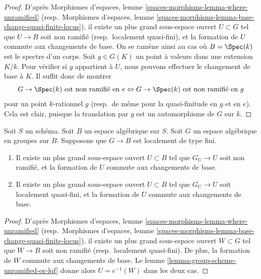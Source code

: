 \begin{proof}
D'après Morphismes d'espaces, lemme \ref{spaces-morphisms-lemma-where-unramified} (resp.\ Morphismes d'espaces, lemme \ref{spaces-morphisms-lemma-base-change-quasi-finite-locus}), il existe un plus grand sous-espace ouvert $U \subset G$ tel que $U \to B$ soit non ramifié (resp.\ localement quasi-fini), et la formation de $U$ commute aux changements de base. On se ramène ainsi au cas où $B = \Spec(k)$ est le spectre d'un corps. Soit $g \in G(K)$ un point à valeurs dans une extension $K/k$. Pour vérifier si $g$ appartient à $U$, nous pouvons effectuer le changement de base à $K$. Il suffit donc de montrer
$$
G \to \Spec(k)\text{ est non ramifié en }e
\Leftrightarrow
G \to \Spec(k)\text{ est non ramifié en }g
$$
pour un point $k$-rationnel $g$ (resp.\ de même pour la quasi-finitude en $g$ et en $e$). Cela est clair, puisque la translation par $g$ est un automorphisme de $G$ sur $k$.
\end{proof}

\begin{lemma}
\label{lemma-open-over-which-unramified-or-lqf}
Soit $S$ un schéma. Soit $B$ un espace algébrique sur $S$. Soit $G$ un espace algébrique en groupes sur $B$. Supposons que $G \to B$ est localement de type fini.
\begin{enumerate}
\item Il existe un plus grand sous-espace ouvert $U \subset B$ tel que $G_U \to U$ soit non ramifié, et la formation de $U$ commute aux changements de base.
\item Il existe un plus grand sous-espace ouvert $U \subset B$ tel que $G_U \to U$ soit localement quasi-fini, et la formation de $U$ commute aux changements de base.
\end{enumerate}
\end{lemma}

\begin{proof}
D'après Morphismes d'espaces, lemme \ref{spaces-morphisms-lemma-where-unramified} (resp.\ Morphismes d'espaces, lemme \ref{spaces-morphisms-lemma-base-change-quasi-finite-locus}), il existe un plus grand sous-espace ouvert $W \subset G$ tel que $W \to B$ soit non ramifié (resp.\ localement quasi-fini). De plus, la formation de $W$ commute aux changements de base. Le lemme \ref{lemma-group-scheme-unramified-or-lqf} donne alors $U = e^{-1}(W)$ dans les deux cas.
\end{proof}












